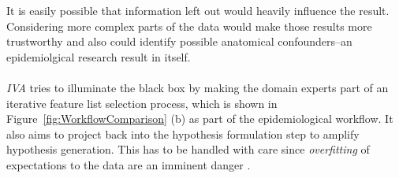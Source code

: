 \documentclass[journal]{style/vgtc} 			          %
\begin{document}
It is easily possible that information left out would heavily influence the result.
%
Considering more complex parts of the data would make those results more trustworthy and also could identify possible anatomical confounders--an epidemiolgical research result in itself.
\\\\
\emph{IVA} tries to illuminate the black box by making the domain experts part of an iterative feature list selection process, which is shown in Figure~\ref{fig:WorkflowComparison} (b) as part of the epidemiological workflow.
%
%
It also aims to project back into the hypothesis formulation step to amplify hypothesis generation.
%
This has to be handled with care since \emph{overfitting} of expectations to the data are an imminent danger \cite{Turkay2013}.
\end{document}
